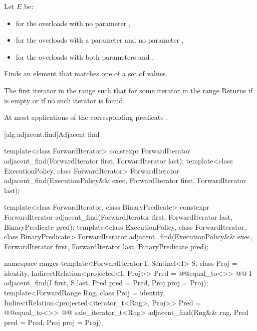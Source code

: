\begin{itemdescr}
{\color{newclr}
\pnum
Let $E$ be:
\begin{itemize}
\item {} for the overloads with no parameter ,
\item {} for the overloads with a parameter  and no parameter ,
\item {} for the overloads with both parameters  and .
\end{itemize}
} %

\pnum
\effects
Finds an element that matches one of a set of values.

\pnum
\returns
The first iterator
in the range 
such that for some
iterator
in the range  
Returns 
if  is empty or
if no such iterator is found.

\pnum
\complexity
At most
applications of the corresponding predicate .
\end{itemdescr}

[alg.adjacent.find]{Adjacent find}

%
\begin{itemdecl}
template<class ForwardIterator>
  constexpr ForwardIterator
    adjacent_find(ForwardIterator first, ForwardIterator last);
template<class ExecutionPolicy, class ForwardIterator>
  ForwardIterator
    adjacent_find(ExecutionPolicy&& exec,
                  ForwardIterator first, ForwardIterator last);

template<class ForwardIterator, class BinaryPredicate>
  constexpr ForwardIterator
    adjacent_find(ForwardIterator first, ForwardIterator last,
                  BinaryPredicate pred);
template<class ExecutionPolicy, class ForwardIterator, class BinaryPredicate>
  ForwardIterator
    adjacent_find(ExecutionPolicy&& exec,
                  ForwardIterator first, ForwardIterator last,
                  BinaryPredicate pred);
\end{itemdecl}
\begin{addedblock}
\begin{itemdecl}
namespace ranges {
  template<ForwardIterator I, Sentinel<I> S, class Proj = identity,
      IndirectRelation<projected<I, Proj>> Pred = @@equal_to<>>
    @@ I adjacent_find(I first, S last, Pred pred = Pred{},
                              Proj proj = Proj{});
  template<ForwardRange Rng, class Proj = identity,
      IndirectRelation<projected<iterator_t<Rng>, Proj>> Pred = @@equal_to<>>
    @@ safe_iterator_t<Rng>
      adjacent_find(Rng&& rng, Pred pred = Pred{}, Proj proj = Proj{});
}
\end{itemdecl}
\end{addedblock}

